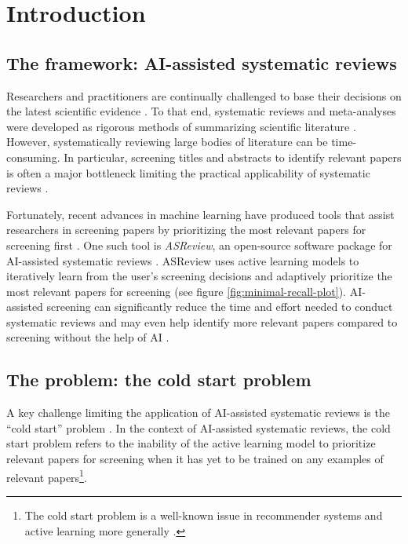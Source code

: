 \documentclass[12pt]{article}
\begin{document}


\section{Introduction}

\subsection{The framework: AI-assisted systematic reviews}

Researchers and practitioners are continually challenged to base their decisions on the latest scientific evidence \parencite{sackett1996evidence, subbiah2023next, sheridan2016achievements, chalmers2002brief}. To that end, systematic reviews and meta-analyses were developed as rigorous methods of summarizing scientific literature \parencite{grant2009typology, brignardello2025systematic, borenstein2021introduction, kicinski2015publication}. However, systematically reviewing large bodies of literature can be time-consuming. In particular, screening titles and abstracts to identify relevant papers is often a major bottleneck limiting the practical applicability of systematic reviews \parencite{nussbaumer2021resource, bastian2010seventy, borah2017analysis}.

Fortunately, recent advances in machine learning have produced tools that assist researchers in screening papers by prioritizing the most relevant papers for screening first \parencite{van2021open, ouzzani2016rayyan, ge2024leveraging, dos2023usefulness}. One such tool is \textit{ASReview}, an open-source software package for AI-assisted systematic reviews \parencite{van2021open, asreviewvs2jonathan}. ASReview uses active learning models to iteratively learn from the user's screening decisions and adaptively prioritize the most relevant papers for screening (see figure \ref{fig:minimal-recall-plot}). AI-assisted screening can significantly reduce the time and effort needed to conduct systematic reviews and may even help identify more relevant papers compared to screening without the help of AI \parencite{teijema2025large, byrne2024impact, ferdinands2023performance, van2025hunt}. 

\subsection{The problem: the cold start problem}

A key challenge limiting the application of AI-assisted systematic reviews is the ``cold start'' problem \parencite{van2021open, teijema2025large}. In the context of AI-assisted systematic reviews, the cold start problem refers to the inability of the active learning model to prioritize relevant papers for screening when it has yet to be trained on any examples of relevant papers\footnote{The cold start problem is a well-known issue in recommender systems and active learning more generally \parencite{panda2022approaches, lika2014facing, bobadilla2013recommender}.}. 
\end{document}
